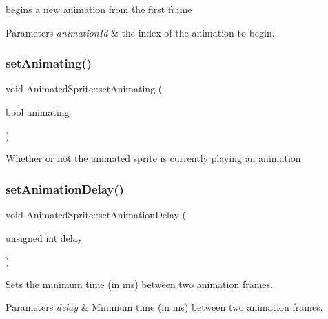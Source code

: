 begins a new animation from the first frame 


\begin{DoxyParams}{Parameters}
{\em animation\+Id} & the index of the animation to begin.\\
\hline
\end{DoxyParams}
\mbox{\label{class_animated_sprite_ab73cac59a5415b0f08eb3963543d9bc8}} 
\subsubsection{\texorpdfstring{set\+Animating()}{setAnimating()}}
{\footnotesize\ttfamily void Animated\+Sprite\+::set\+Animating (\begin{DoxyParamCaption}\item[{bool}]{animating }\end{DoxyParamCaption})}



Whether or not the animated sprite is currently playing an animation

\mbox{\label{class_animated_sprite_a4dd9673ba304de36d69f15fe367a6e82}} 
\subsubsection{\texorpdfstring{set\+Animation\+Delay()}{setAnimationDelay()}}
{\footnotesize\ttfamily void Animated\+Sprite\+::set\+Animation\+Delay (\begin{DoxyParamCaption}\item[{unsigned int}]{delay }\end{DoxyParamCaption})}



Sets the minimum time (in ms) between two animation frames. 


\begin{DoxyParams}{Parameters}
{\em delay} & Minimum time (in ms) between two animation frames.\\
\hline
\end{DoxyParams}
\mbox{\label{class_animated_sprite_ab3a1384d836bc7f9b8580dccf33c2f1c}} 
